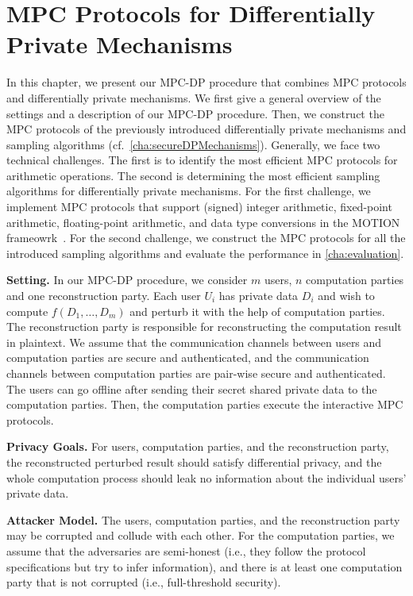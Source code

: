 \chapter{MPC Protocols for Differentially Private Mechanisms}
\label{cha:MPCProtocolsforDifferentiallyPrivateMechanisms}

In this chapter, we present our MPC-DP procedure that combines MPC protocols and differentially private mechanisms.
We first give a general overview of the settings and a description of our MPC-DP procedure.
Then, we construct the MPC protocols of the previously introduced differentially private mechanisms and sampling algorithms (cf.~\autoref{cha:secureDPMechanisms}).
Generally, we face two technical challenges.
The first is to identify the most efficient MPC protocols for arithmetic operations.
The second is determining the most efficient sampling algorithms for differentially private mechanisms.
For the first challenge, we implement MPC protocols that support (signed) integer arithmetic, fixed-point arithmetic, floating-point arithmetic, and data type conversions in the MOTION frameowrk~\cite{braun2022motion}.
For the second challenge, we construct the MPC protocols for all the introduced sampling algorithms and evaluate the performance in \autoref{cha:evaluation}.

\textbf{Setting.} In our MPC-DP procedure, we consider $m$ users, $n$ computation parties and one reconstruction party. Each user $U_i$ has private data $D_i$ and wish to compute $f\left(D_1,\ldots, D_m\right) $ and perturb it with the help of computation parties. The reconstruction party is responsible for reconstructing the computation result in plaintext. We assume that the communication channels between users and computation parties are secure and authenticated, and the communication channels between computation parties are pair-wise secure and authenticated. The users can go offline after sending their secret shared private data to the computation parties. Then, the computation parties execute the interactive MPC protocols.

\textbf{Privacy Goals.} For users, computation parties, and the reconstruction party, the reconstructed perturbed result should satisfy differential privacy, and the whole computation process should leak no information about the individual users' private data.

\textbf{Attacker Model.} The users, computation parties, and the reconstruction party may be corrupted and collude with each other.
For the computation parties, we assume that the adversaries are semi-honest (i.e., they follow the protocol specifications but try to infer information), and there is at least one computation party that is not corrupted (i.e., full-threshold security).


